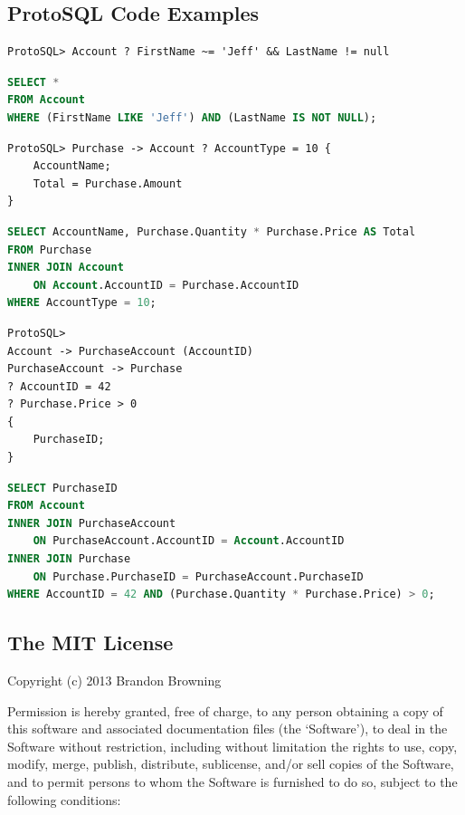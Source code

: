 \documentclass[titlepage]{article}
\begin{document}
	\vspace{5mm}

		\subsection{ProtoSQL Code Examples}

\begin{lstlisting}[language=ProtoSQL]
ProtoSQL> Account ? FirstName ~= 'Jeff' && LastName != null
\end{lstlisting}

\begin{lstlisting}[language=SQL]
SELECT *
FROM Account
WHERE (FirstName LIKE 'Jeff') AND (LastName IS NOT NULL);
\end{lstlisting}

\begin{lstlisting}[language=ProtoSQL]
ProtoSQL> Purchase -> Account ? AccountType = 10 {
	AccountName;
	Total = Purchase.Amount
}
\end{lstlisting}

\begin{lstlisting}[language=SQL]
SELECT AccountName, Purchase.Quantity * Purchase.Price AS Total
FROM Purchase
INNER JOIN Account
    ON Account.AccountID = Purchase.AccountID
WHERE AccountType = 10;
\end{lstlisting}

\begin{lstlisting}[language=ProtoSQL]
ProtoSQL>
Account -> PurchaseAccount (AccountID)
PurchaseAccount -> Purchase
? AccountID = 42
? Purchase.Price > 0
{
	PurchaseID;
}
\end{lstlisting}

\begin{lstlisting}[language=SQL]
SELECT PurchaseID
FROM Account
INNER JOIN PurchaseAccount
    ON PurchaseAccount.AccountID = Account.AccountID
INNER JOIN Purchase
    ON Purchase.PurchaseID = PurchaseAccount.PurchaseID
WHERE AccountID = 42 AND (Purchase.Quantity * Purchase.Price) > 0;
\end{lstlisting}

		\subsection{The MIT License}

		Copyright (c) 2013 Brandon Browning
		\newline

		Permission is hereby granted, free of charge, to any person obtaining a copy of this software and associated documentation files (the `Software'), to deal in the Software without restriction, including without limitation the rights to use, copy, modify, merge, publish, distribute, sublicense, and/or sell copies of the Software, and to permit persons to whom the Software is furnished to do so, subject to the following conditions:
		\newline
\end{document}
